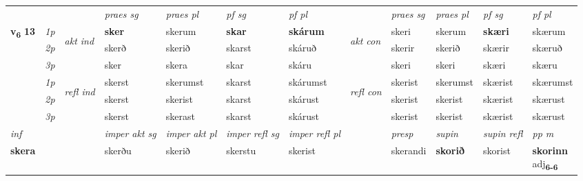 \begin{longtable}[l]{X>{\footnotesize\itshape}llXXXXlXXXX}
 & &   & \textit{praes sg}  & \textit{praes pl}    & \textit{ pf sg} & \textit{pf pl} & & \textit{praes sg}  & \textit{praes pl}    & \textit{pf sg} & \textit{pf pl }  \\ \cmidrule{4-7} \cmidrule{9-12}
 \multirow{2}{*}{{{\textbf{v{\textsubscript{6}}} \Large{\textbf{13}}}}}  & 1p & \multirow{3}{*}{\begin{turn}{90}\textit{akt ind}\end{turn}} & \textbf{sker} & skerum & \textbf{skar} & \textbf{skárum} & \multirow{3}{*}{\begin{turn}{90}\textit{akt con}\end{turn}} &skeri & skerum & \textbf{skæri} & skærum\\*
 & 2p &  &  skerð  & skerið & skarst & skáruð & & skerir & skerið & skærir & skæruð \\*
 & 3p &  & sker & skera & skar & skáru & & skeri & skeri& skæri & skæru \\*
\cmidrule{4-7} \cmidrule{9-12}
 & 1p & \multirow{3}{*}{\begin{turn}{90}\textit{refl ind}\end{turn}}  & skerst & skerumst & skarst & skárumst & \multirow{3}{*}{\begin{turn}{90}\textit{refl con}\end{turn}}  &skerist & skerumst & skærist & skærumst \\*
 & 2p &  & skerst & skerist & skarst & skárust & &skerist & skerist & skærist & skærust \\*
 & 3p  & & skerst & skerast & skarst & skárust & & skerist & skerist& skærist & skærust \\*
\cmidrule{4-7} \cmidrule{9-12}

   {\textit{inf}} & &  & \textit{imper akt sg} & \textit{imper akt pl} & \textit{imper refl sg} & \textit{imper refl pl} && \textit{presp} & \textit{supin} & \textit{supin refl} & \textit{pp m} \\*
  {\textbf{skera}} & && skerðu  & skerið & skerstu & skerist && skerandi &  \textbf{skorið} & skorist & \specialcell{\textbf{skorinn} \\ adj\textbf{\textsubscript{6-6}}} \\*

\midrule


\end{longtable}
